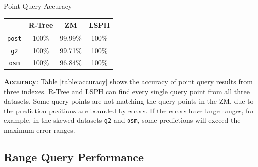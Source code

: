 \begin{center}
\begin{adjustbox}{max width={\textwidth}, max totalheight={\textheight},keepaspectratio}
\begin{threeparttable}
\caption{Point Query Accuracy}
\begin{tabular}{c|c c c}
    \toprule
        &\textbf{R-Tree}  & \textbf{ZM} & \textbf{LSPH}             \\ \midrule 
    \texttt{post}    & 100\% & 99.99\% & 100\% \\
    \texttt{g2}      & 100\% & 99.71\% & 100\%  \\
    \texttt{osm}     & 100\% & 96.84\% & 100\% \\
     \bottomrule
\end{tabular}
\end{threeparttable}
\label{table:accuracy}
\end{adjustbox}
\end{center}

\textbf{Accuracy}: Table \ref{table:accuracy} shows the accuracy of point query results from three indexes. R-Tree and LSPH can find every single query point from all three datasets. Some query points are not matching the query points in the ZM, due to the prediction positions are bounded by errors. If the errors have large ranges, for example, in the skewed datasets \texttt{g2} and \texttt{osm}, some predictions will exceed the maximum error ranges.


\subsection{Range Query Performance}

